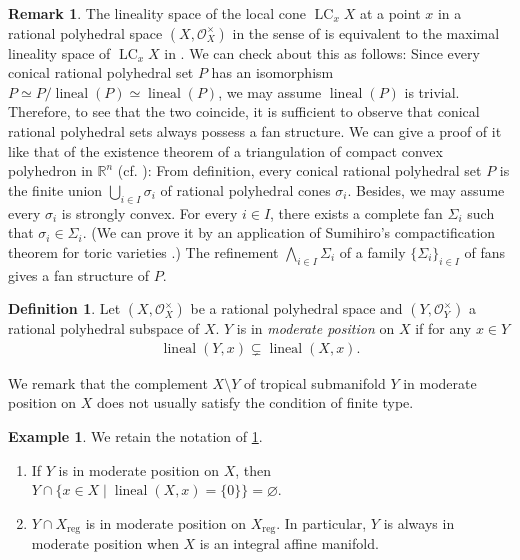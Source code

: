 \documentclass[a4paper,dvipdfmx,reqno,12pt]{amsart}
\theoremstyle{definition}
\newtheorem{definition}[theorem]{Definition}
\newtheorem{example}[theorem]{Example}
\newtheorem{remark}[theorem]{Remark}
\newcommand{\opn}[1]{\operatorname{#1}}
\numberwithin{equation}{section}
\begin{document}
\begin{remark}
The lineality space of the local cone $\opn{LC}_x X$
at a point $x$ in a rational polyhedral space
$(X,\mathcal{O}_X^{\times})$ in the sense of 
\cite[]{MR4246795}
is equivalent to
the maximal lineality space of $\opn{LC}_x X$ in
\cite[]{MR3041763}.
We can check about this as follows:
Since every conical rational polyhedral set $P$ has an isomorphism
$P\simeq P/\opn{lineal}(P)\simeq \opn{lineal}(P)$, we
may assume $\opn{lineal}(P)$ is trivial.
Therefore, to see that the two coincide,
it is sufficient to observe that 
conical rational polyhedral sets
always possess a fan structure.
We can give a proof of it like
that of the existence theorem
of a triangulation of compact convex polyhedron
in $\mathbb{R}^{n}$ (cf. \cite[Theorem 2.11]{MR665919}):
From definition, every conical rational polyhedral set $P$
is the finite union $\bigcup_{i\in I}\sigma_i$ of 
rational polyhedral cones $\sigma_i$.
Besides, we may assume every $\sigma_i$ is strongly convex.
For every $i\in I$, there exists a
complete fan $\Sigma_i$ such that $\sigma_i\in\Sigma_i$.
(We can prove it by an application of Sumihiro's
compactification theorem for toric varieties
\cite[Theorem 3]{MR337963}.)
The refinement $\bigwedge_{i\in I}\Sigma_i$
of a family $\{\Sigma_i\}_{i\in I}$ of fans gives
a fan structure of $P$.
\end{remark}

\begin{definition}
\label{definition-permissible-position}
Let $(X,\mathcal{O}_X^{\times})$
be a rational polyhedral space  and 
$(Y,\mathcal{O}_Y^{\times})$ a
rational polyhedral subspace of $X$.
$Y$ is in \emph{moderate position} on $X$ if
for any $x\in Y$
\begin{align}
     \opn{lineal}(Y,x) \subsetneq
 \opn{lineal}(X,x).
\end{align}
\end{definition}
We remark that
the complement $X\setminus Y$ of tropical submanifold
$Y$ in moderate position on $X$
does not usually satisfy the condition of finite type. 
\begin{example}
We retain the notation of 
\cref{definition-permissible-position}.
\begin{enumerate}
\item If $Y$ is in moderate position on $X$, then
$Y\cap\{x\in X\mid \opn{lineal}(X,x)=\{0\}\}
=\varnothing$.
\item $Y\cap X_{\mathrm{reg}}$ is in 
moderate position on $X_{\mathrm{reg}}$.
In particular, $Y$ is always in moderate position
when $X$ is an integral affine manifold.
\end{enumerate}
\end{example}
\end{document}
